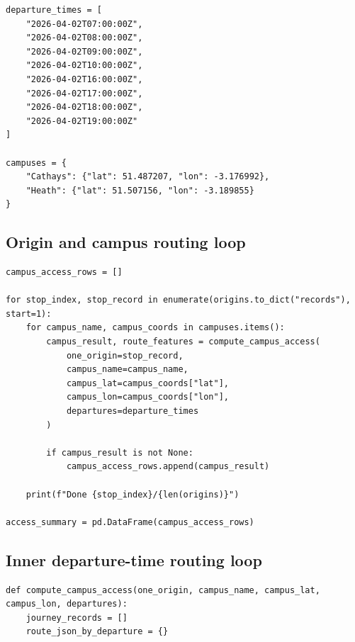\documentclass[11pt,a4paper]{article}
\begin{document}
\begin{appendices}
\begin{lstlisting}[style=pythonappendix, caption={API endpoints, field masks and sampled departure times}, label={lst:api_setup}]
departure_times = [
    "2026-04-02T07:00:00Z",
    "2026-04-02T08:00:00Z",
    "2026-04-02T09:00:00Z",
    "2026-04-02T10:00:00Z",
    "2026-04-02T16:00:00Z",
    "2026-04-02T17:00:00Z",
    "2026-04-02T18:00:00Z",
    "2026-04-02T19:00:00Z"
]

campuses = {
    "Cathays": {"lat": 51.487207, "lon": -3.176992},
    "Heath": {"lat": 51.507156, "lon": -3.189855}
}
\end{lstlisting}

\subsection*{Origin and campus routing loop}

\begin{lstlisting}[style=pythonappendix, caption={Main loop over origin stops and campus destinations}, label={lst:origin_campus_loop}]
campus_access_rows = []

for stop_index, stop_record in enumerate(origins.to_dict("records"), start=1):
    for campus_name, campus_coords in campuses.items():
        campus_result, route_features = compute_campus_access(
            one_origin=stop_record,
            campus_name=campus_name,
            campus_lat=campus_coords["lat"],
            campus_lon=campus_coords["lon"],
            departures=departure_times
        )

        if campus_result is not None:
            campus_access_rows.append(campus_result)

    print(f"Done {stop_index}/{len(origins)}")

access_summary = pd.DataFrame(campus_access_rows)
\end{lstlisting}

\subsection*{Inner departure-time routing loop}

\begin{lstlisting}[style=pythonappendix, caption={Loop over sampled departure times for each origin--campus pair}, label={lst:departure_time_loop}]
def compute_campus_access(one_origin, campus_name, campus_lat, campus_lon, departures):
    journey_records = []
    route_json_by_departure = {}


\end{lstlisting}
\end{appendices}
\end{document}
